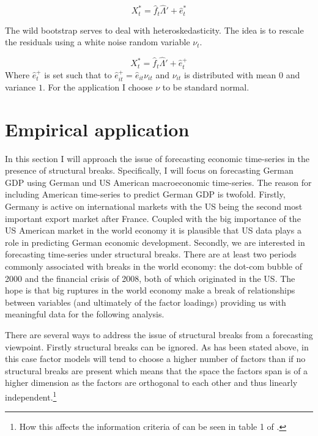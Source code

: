 \documentclass[12pt]{article}
\begin{document}
\begin{equation}
	\label{factor equation, bootstrapped}
	X_t^* = \hat f_t \hat \Lambda' + \hat e_t^*
\end{equation}

The wild bootstrap serves to deal with heteroskedasticity. The idea is to rescale the residuals using a white noise random variable $\nu_t$.

$$X_t^* = \hat f_t \hat \Lambda' + \hat e_t^+$$
Where $\hat e_t^+$ is set such that to $\hat e_{it}^+ = \hat e_{it} \nu_{it}$ and $\nu_{it}$ is distributed with mean $0$ and variance $1$. For the application I choose $\nu$ to be standard normal.




\section{Empirical application}
In this section I will approach the issue of forecasting economic time-series in the presence of structural breaks. Specifically, I will focus on forecasting German GDP using German und US American macroeconomic time-series. The reason for including American time-series to predict German GDP is twofold. Firstly, Germany is active on international markets with the US being the second most important export market after France. Coupled with the big importance of the US American market in the world economy it is plausible that US data plays a role in predicting German economic development. Secondly, we are interested in forecasting time-series under structural breaks. There are at least two periods commonly associated with breaks in the world economy: the dot-com bubble of 2000 and the financial crisis of 2008, both of which originated in the US. The hope is that big ruptures in the world economy make a break of relationships between variables (and ultimately of the factor loadings) providing us with meaningful data for the following analysis.

There are several ways to address the issue of structural breaks from a forecasting viewpoint. Firstly structural breaks can be ignored. As has been stated above, in this case factor models will tend to choose a higher number of factors than if no structural breaks are present which means that the space the factors span is of a higher dimension as the factors are orthogonal to each other and thus linearly independent.\footnote{How this affects the information criteria of \citet{bai2002determining} can be seen in table 1 of \citet{breitung2011testing}.}
\end{document}
